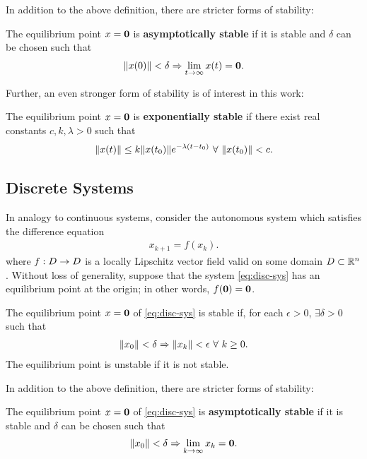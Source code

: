 In addition to the above definition, there are stricter forms of stability:
\begin{definition}
  The equilibrium point $x = {\mathbf 0}$ is {\bf asymptotically stable} if it is
  stable and $\delta$ can be chosen such that
  \begin{align*}
    \|x(0)\| < \delta \Rightarrow \lim_{t \to \infty} x(t) = {\mathbf 0}.
  \end{align*}
\end{definition}

Further, an even stronger form of stability is of interest in this work:
\begin{definition}
  The equilibrium point $x = {\mathbf 0}$ is {\bf exponentially stable} if there
  exist real constants $c, k, \lambda > 0$ such that
  \begin{align*}
    \nxt \leq k \nxtnaught e^{-\lambda (t - t_{0})} \ \forall \ \nxtnaught
    < c.
  \end{align*}
\end{definition}


\subsection{Discrete Systems}

In analogy to continuous systems, consider the autonomous system which satisfies
the difference equation
\begin{align}
  \label{eq:disc-sys}
  x_{k+1} = f(x_{k}).
\end{align}
where $f : D \to D$ is a locally Lipschitz vector field valid on some domain
$D \subset \mathbb{R}^{n}$.
%
Without loss of generality, suppose that the system \eqref{eq:disc-sys} has an
equilibrium point at the origin;
%
in other words, $f({\mathbf 0}) = {\mathbf 0}$.
%
\begin{definition}
  The equilibrium point $x = {\mathbf 0}$ of \eqref{eq:disc-sys} is stable if, for each $\epsilon > 0$,
  $\exists \delta > 0$ such that
  \begin{align*}
    \|x_{0}\| < \delta \Rightarrow \|x_{k}\| < \epsilon \ \forall \ k
    \geq 0.
  \end{align*}
  The equilibrium point is unstable if it is not stable.
\end{definition}

In addition to the above definition, there are stricter forms of stability:
\begin{definition}
  The equilibrium point $x = {\mathbf 0}$ of \eqref{eq:disc-sys} is {\bf asymptotically stable} if it is
  stable and $\delta$ can be chosen such that
  \begin{align*}
    \|x_{0}\| < \delta \Rightarrow \lim_{k \to \infty} x_{k} = {\mathbf 0}.
  \end{align*}
\end{definition}

